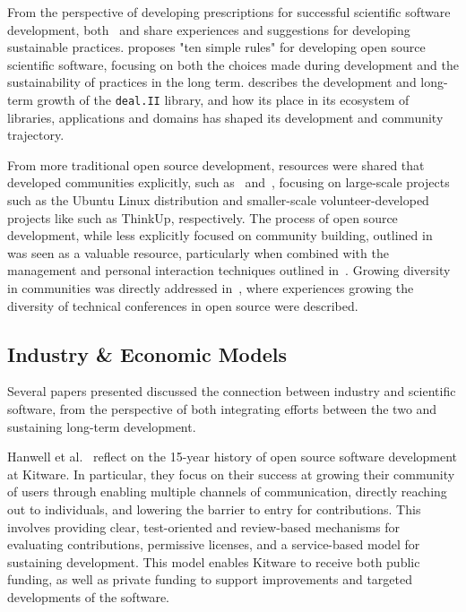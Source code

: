 \documentclass[11pt, oneside]{amsart}
\newcommand{\toolname}[1] {\textsf{#1}}
\begin{document}
From the perspective of developing prescriptions for successful
scientific software development, both~\cite{citeulike:11831265} and
\cite{1749-4699-6-1-015010} share experiences and suggestions for
developing sustainable practices.  \cite{citeulike:11831265} proposes
"ten simple rules" for developing open source scientific software,
focusing on both the choices made during development and the
sustainability of practices in the long term.
\cite{1749-4699-6-1-015010} describes the development and long-term
growth of the \texttt{deal.II} library, and how its place in its
ecosystem of libraries, applications and domains has shaped its
development and community trajectory.

From more traditional open source development, resources were shared
that developed communities explicitly, such
as~\cite{citeulike:7888211} and~\cite{Trapani:2011}, focusing on
large-scale projects such as the Ubuntu Linux distribution and
smaller-scale volunteer-developed projects like such as ThinkUp,
respectively. The process of open source development, while less
explicitly focused on community building, outlined
in~\cite{citeulike:478633} was seen as a valuable resource,
particularly when combined with the management and personal
interaction techniques outlined in~\cite{opac-b1134063}.  Growing
diversity in communities was directly addressed
in~\cite{Allsopp:2012}, where experiences growing the diversity of
technical conferences in open source were described.

\subsection{Industry \& Economic Models}

Several papers presented discussed the connection between industry and
scientific software, from the perspective of both integrating efforts
between the two and sustaining long-term development.

Hanwell et al.~\cite{Hanwell_WSSSPE} reflect on the 15-year history of
open source software development at \toolname{Kitware}.  In
particular, they focus on their success at growing their community of
users through enabling multiple channels of communication, directly
reaching out to individuals, and lowering the barrier to entry for
contributions. This involves providing clear, test-oriented and
review-based mechanisms for evaluating contributions, permissive
licenses, and a service-based model for sustaining development.  This
model enables \toolname{Kitware} to receive both public funding, as
well as private funding to support improvements and targeted
developments of the software.
\end{document}
